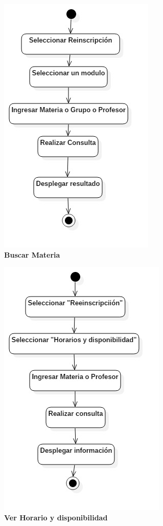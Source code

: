 \begin{figure}[H]
  \centering
    \includegraphics[scale=.8,angle=0]{project/Actividades/Buscar_Materia.jpg}
  \caption{\textbf{Buscar Materia}}
\end{figure}
\begin{figure}[H]
  \centering
    \includegraphics[scale=.8,angle=0]{project/Actividades/Ver_horario_y_disponibilidad.jpg}
  \caption{\textbf{Ver Horario y disponibilidad}}
\end{figure}

